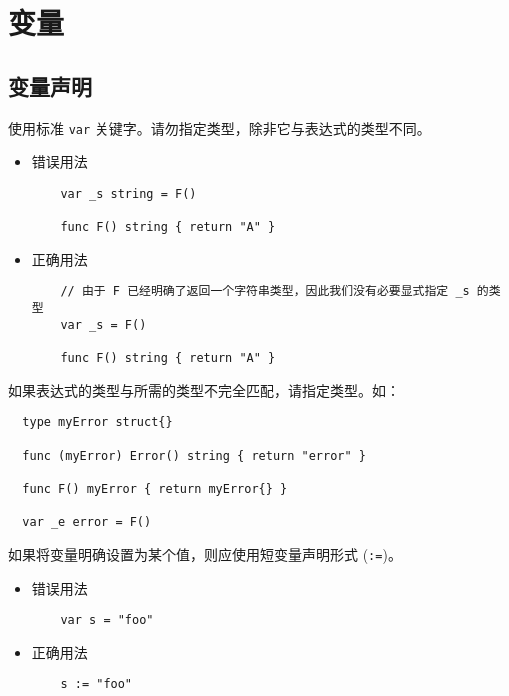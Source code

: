 \chapter{变量}
\section{变量声明}
使用标准 \texttt{var} 关键字。请勿指定类型，除非它与表达式的类型不同。
\begin{itemize}[leftmargin=4em]
\item 错误用法

  \begin{verbatim}
    var _s string = F()

    func F() string { return "A" }
  \end{verbatim}
\item 正确用法

  \begin{verbatim}
    // 由于 F 已经明确了返回一个字符串类型，因此我们没有必要显式指定 _s 的类型
    var _s = F()

    func F() string { return "A" }
  \end{verbatim}
\end{itemize}

如果表达式的类型与所需的类型不完全匹配，请指定类型。如：
\begin{verbatim}
  type myError struct{}

  func (myError) Error() string { return "error" }

  func F() myError { return myError{} }

  var _e error = F()
\end{verbatim}

如果将变量明确设置为某个值，则应使用短变量声明形式 (\texttt{:=})。
\begin{itemize}[leftmargin=4em]
\item 错误用法

  \begin{verbatim}
    var s = "foo"
  \end{verbatim}
\item 正确用法

  \begin{verbatim}
    s := "foo"
  \end{verbatim}
\end{itemize}

